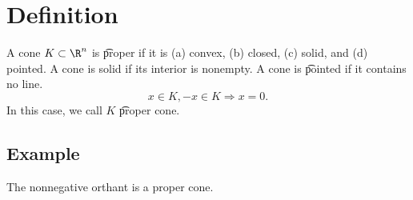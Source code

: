 

\section*{Definition}

A cone $K \subset \R ^n$ is \t{proper} if it is (a) convex, (b) closed, (c) solid, and (d) pointed.
A cone is solid if its interior is nonempty.
A cone is \t{pointed} if it contains no line.
\[
x \in K, -x \in K \Rightarrow x = 0.
\]
In this case, we call $K$ \t{proper cone}.

\subsection*{Example}

The nonnegative orthant is a proper cone.

\blankpage